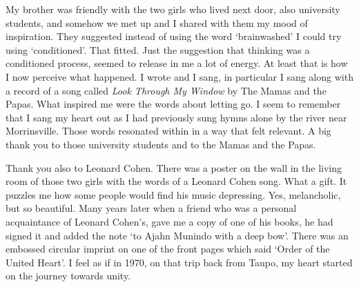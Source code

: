 My brother was friendly with the two girls who lived next door, also
university students, and somehow we met up and I shared with them my
mood of inspiration. They suggested instead of using the word
`brainwashed' I could try using `conditioned'. That fitted. Just the
suggestion that thinking was a conditioned process, seemed to release in
me a lot of energy. At least that is how I now perceive what happened. I
wrote and I sang, in particular I sang along with a record of a song
called \emph{Look Through My Window}\cite{window} by The Mamas and the Papas. What
inspired me were the words
about letting go. I seem to remember that I sang my heart out
as I had previously sung hymns alone by the river near Morrinsville. Those words
resonated within in a way that felt relevant. A big thank you
to those university students and to the Mamas and the Papas.

Thank you also to Leonard Cohen. There was a poster on the wall in the
living room of those two girls with the words of a Leonard Cohen song.
What a gift. It puzzles me how some people would find his music
depressing. Yes, melancholic, but so beautiful. Many years later when a
friend who was a personal acquaintance of Leonard Cohen's, gave me a
copy of one of his books, he had signed it and added the note `to Ajahn
Munindo with a deep bow'. There was an embossed circular imprint
on one of the front pages which said `Order of the United Heart'. I feel
as if in 1970, on that trip back from Taupo, my heart started on the
journey towards unity.

